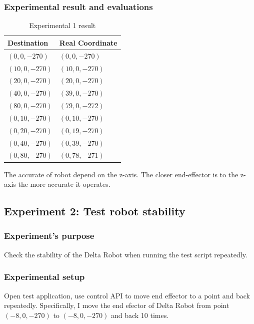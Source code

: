 \subsubsection{Experimental result and evaluations}
\begin{table}[H]
	\centering
	\caption{Experimental 1 result}	
	\label{tab:experiment_1}
	\begin{tabularx}{0.4\textwidth}{l|l}
		\toprule
		\textbf{Destination}	& \textbf{Real Coordinate} \\
		\midrule 
		$(0,0,-270)$			& $(0,0,-270)$ \\
		\midrule 
		$(10,0,-270)$			& $(10,0,-270)$ \\
		\midrule
		$(20,0,-270)$			& $(20,0,-270)$ \\ 
		\midrule
		$(40,0,-270)$			& $(39,0,-270)$ \\ 
		\midrule
		$(80,0,-270)$			& $(79,0,-272)$ \\ 
		\midrule
		$(0,10,-270)$			& $(0,10,-270)$ \\ 
		\midrule
		$(0,20,-270)$			& $(0,19,-270)$ \\ 
		\midrule
		$(0,40,-270)$			& $(0,39,-270)$ \\ 
		\midrule
		$(0,80,-270)$			& $(0,78,-271)$ \\ 
		\bottomrule
	\end{tabularx}
\end{table}

The accurate of robot depend on the z-axis. The closer end-effector is to the z-axis the more accurate it operates.

\subsection{Experiment 2: Test robot stability}
\subsubsection{Experiment's purpose}
Check the stability of the Delta Robot when running the test script repeatedly.
\subsubsection{Experimental setup}
Open test application, use control API to move end effector to a point and back repeatedly. Specifically, I move the end efector of Delta Robot from point $(-8, 0, -270)$ to $(-8, 0, -270)$ and back 10 times.

